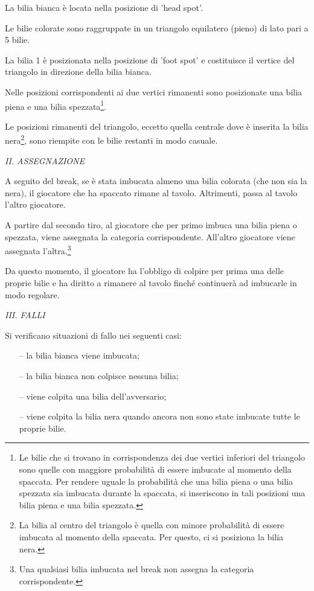 \documentclass[12pt,a4paper]{report}
\begin{document}
La bilia bianca è locata nella posizione di 'head spot'.

Le bilie colorate sono raggruppate in un triangolo equilatero (pieno) di lato pari a 5 bilie.

La bilia 1 è posizionata nella posizione di 'foot spot' e costituisce il vertice del triangolo in direzione della bilia bianca.

Nelle posizioni corrispondenti ai due vertici rimanenti sono posizionate una bilia piena e una bilia spezzata\footnote{Le bilie che si trovano in corrispondenza dei due vertici inferiori del triangolo sono quelle con maggiore probabilità di essere imbucate al momento della spaccata. Per rendere uguale la probabilità che una bilia piena o una bilia spezzata sia imbucata durante la spaccata, si inseriscono in tali posizioni una bilia piena e una bilia spezzata.}.

Le posizioni rimanenti del triangolo, eccetto quella centrale dove è inserita la bilia nera\footnote{La bilia al centro del triangolo è quella con minore probabilità di essere imbucata al momento della spaccata. Per questo, ci si posiziona la bilia nera.}, sono riempite con le bilie restanti in modo casuale.

\vspace{9mm}
\noindent \emph{II. ASSEGNAZIONE}

A seguito del break, se è stata imbucata almeno una bilia colorata (che non sia la nera), il giocatore che ha spaccato rimane al tavolo.
Altrimenti, passa al tavolo l'altro giocatore.

A partire dal secondo tiro, al giocatore che per primo imbuca una bilia piena o spezzata, viene assegnata la categoria corrispondente.
All'altro giocatore viene assegnata l'altra.\footnote{Una qualsiasi bilia imbucata nel break non assegna la categoria corrispondente.}

Da questo momento, il giocatore ha l'obbligo di colpire per prima una delle proprie bilie e ha diritto a rimanere al tavolo finché continuerà ad imbucarle in modo regolare.

\vspace{9mm}
\noindent \emph{III. FALLI}

Si verificano situazioni di fallo nei seguenti casi:
\begin{itemize}[noitemsep]
    \item[--]la bilia bianca viene imbucata;
    \item[--] la bilia bianca non colpisce nessuna bilia;
    \item[--] viene colpita una bilia dell'avversario;
    \item[--] viene colpita la bilia nera quando ancora non sono state imbucate tutte le proprie bilie.
\end{itemize}
\end{document}
